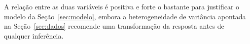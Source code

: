 \documentclass[12pt,a4paper]{article}
\begin{document}
A relação entre as duas variáveis é positiva e forte o bastante para
justificar o modelo da Seção~\ref{sec:modelo}, embora a heterogeneidade de
variância apontada na Seção~\ref{sec:dados} recomende uma transformação da
resposta antes de qualquer inferência.




\end{document}

